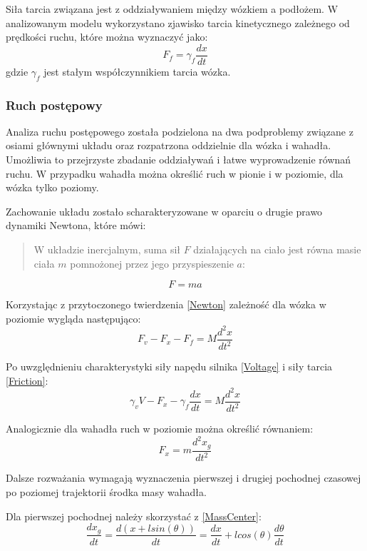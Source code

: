 \documentclass[12pt, twoside, openany]{report}
\theoremstyle{definition}
\begin{document}
\newpage
Siła tarcia związana jest z oddziaływaniem między wózkiem a podłożem. W analizowanym modelu wykorzystano zjawisko tarcia kinetycznego zależnego od prędkości ruchu, które można wyznaczyć jako:
\begin{equation} \label{Friction}
F_f = \gamma_f \frac{dx}{dt}
\end{equation}
gdzie $\gamma_f$ jest stałym współczynnikiem tarcia wózka.

\subsubsection{Ruch postępowy}
Analiza ruchu postępowego została podzielona na dwa podproblemy związane z osiami głównymi układu oraz rozpatrzona oddzielnie dla wózka i wahadła. Umożliwia to przejrzyste zbadanie oddziaływań i łatwe wyprowadzenie równań ruchu. W przypadku wahadła można określić ruch w pionie i w poziomie, dla wózka tylko poziomy. 

Zachowanie układu zostało scharakteryzowane w oparciu o drugie prawo dynamiki Newtona, które mówi:
\begin{quote}
W układzie inercjalnym, suma sił $F$ działających na ciało jest równa masie ciała $m$ pomnożonej przez jego przyspieszenie $a$:
\end{quote}
\begin{equation} \label{Newton}
F = ma
\end{equation}

Korzystając z przytoczonego twierdzenia \ref{Newton} zależność dla wózka w poziomie wygląda następująco:
\begin{equation}
F_v - F_x - F_f = M \frac{d^2x}{dt^2}
\end{equation}

Po uwzględnieniu charakterystyki siły napędu silnika \ref{Voltage} i siły tarcia \ref{Friction}:
\begin{equation} \label{CartX}
\gamma_v V - F_x - \gamma_f \frac{dx}{dt} = M \frac{d^2x}{dt^2}
\end{equation}

Analogicznie dla wahadła ruch w poziomie można określić równaniem:
\begin{equation} \label{PendulumX}
F_x = m \frac{d^2x_g}{dt^2}
\end{equation}

Dalsze rozważania wymagają wyznaczenia pierwszej i drugiej pochodnej czasowej po poziomej trajektorii środka masy wahadła.

Dla pierwszej pochodnej należy skorzystać z \ref{MassCenter}:
\begin{equation} \label{FirstDerivative}
\frac{dx_g}{dt} = \frac{d(x + lsin(\theta))}{dt} = \frac{dx}{dt} + lcos(\theta)\frac{d\theta}{dt}
\end{equation}
\end{document}
